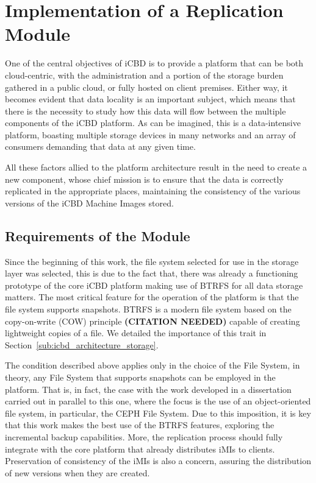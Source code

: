 \section{Implementation of a Replication Module}
\label{sec:impl_replication}

One of the central objectives of iCBD is to provide a platform that can be both cloud-centric, with the administration and a portion of the storage burden gathered in a public cloud, or fully hosted on client premises. Either way, it becomes evident that data locality is an important subject, which means that there is the necessity to study how this data will flow between the multiple components of the iCBD platform.
As can be imagined, this is a data-intensive platform, boasting multiple storage devices in many networks and an array of consumers demanding that data at any given time.

All these factors allied to the platform architecture result in the need to create a new component, whose chief mission is to ensure that the data is correctly replicated in the appropriate places, maintaining the consistency of the various versions of the iCBD Machine Images stored.



\subsection{Requirements of the Module}
\label{sub:requirements_icbdrep}

Since the beginning of this work, the file system selected for use in the storage layer was selected, this is due to the fact that, there was already a functioning prototype of the core iCBD platform making use of BTRFS for all data storage matters. The most critical feature for the operation of the platform is that the file system supports snapshots. BTRFS is a modern file system based on the copy-on-write (COW) principle \textbf{(CITATION NEEDED)} capable of creating lightweight copies of a file. We detailed the importance of this trait in Section~\ref{sub:icbd_architecture_storage}.
 
The condition described above applies only in the choice of the File System, in theory, any File System that supports snapshots can be employed in the platform. That is, in fact, the case with the work developed in a dissertation carried out in parallel to this one, where the focus is the use of an object-oriented file system, in particular, the CEPH File System.
Due to this imposition, it is key that this work makes the best use of the BTRFS features, exploring the incremental backup capabilities. More, the replication process should fully integrate with the core platform that already distributes iMIs to clients. Preservation of consistency of the iMIs is also a concern, assuring the distribution of new versions when they are created.

